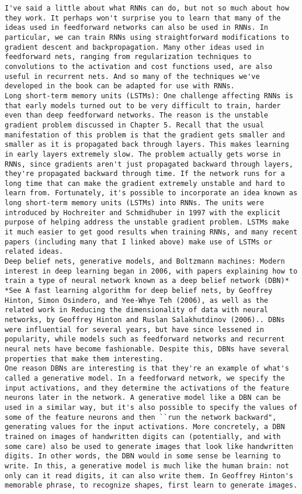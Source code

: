 \begin{lstlisting}
I've said a little about what RNNs can do, but not so much about how they work. It perhaps won't surprise you to learn that many of the ideas used in feedforward networks can also be used in RNNs. In particular, we can train RNNs using straightforward modifications to gradient descent and backpropagation. Many other ideas used in feedforward nets, ranging from regularization techniques to convolutions to the activation and cost functions used, are also useful in recurrent nets. And so many of the techniques we've developed in the book can be adapted for use with RNNs.
Long short-term memory units (LSTMs): One challenge affecting RNNs is that early models turned out to be very difficult to train, harder even than deep feedforward networks. The reason is the unstable gradient problem discussed in Chapter 5. Recall that the usual manifestation of this problem is that the gradient gets smaller and smaller as it is propagated back through layers. This makes learning in early layers extremely slow. The problem actually gets worse in RNNs, since gradients aren't just propagated backward through layers, they're propagated backward through time. If the network runs for a long time that can make the gradient extremely unstable and hard to learn from. Fortunately, it's possible to incorporate an idea known as long short-term memory units (LSTMs) into RNNs. The units were introduced by Hochreiter and Schmidhuber in 1997 with the explicit purpose of helping address the unstable gradient problem. LSTMs make it much easier to get good results when training RNNs, and many recent papers (including many that I linked above) make use of LSTMs or related ideas.
Deep belief nets, generative models, and Boltzmann machines: Modern interest in deep learning began in 2006, with papers explaining how to train a type of neural network known as a deep belief network (DBN)* *See A fast learning algorithm for deep belief nets, by Geoffrey Hinton, Simon Osindero, and Yee-Whye Teh (2006), as well as the related work in Reducing the dimensionality of data with neural networks, by Geoffrey Hinton and Ruslan Salakhutdinov (2006).. DBNs were influential for several years, but have since lessened in popularity, while models such as feedforward networks and recurrent neural nets have become fashionable. Despite this, DBNs have several properties that make them interesting.
One reason DBNs are interesting is that they're an example of what's called a generative model. In a feedforward network, we specify the input activations, and they determine the activations of the feature neurons later in the network. A generative model like a DBN can be used in a similar way, but it's also possible to specify the values of some of the feature neurons and then ``run the network backward", generating values for the input activations. More concretely, a DBN trained on images of handwritten digits can (potentially, and with some care) also be used to generate images that look like handwritten digits. In other words, the DBN would in some sense be learning to write. In this, a generative model is much like the human brain: not only can it read digits, it can also write them. In Geoffrey Hinton's memorable phrase, to recognize shapes, first learn to generate images.

\end{lstlisting}
